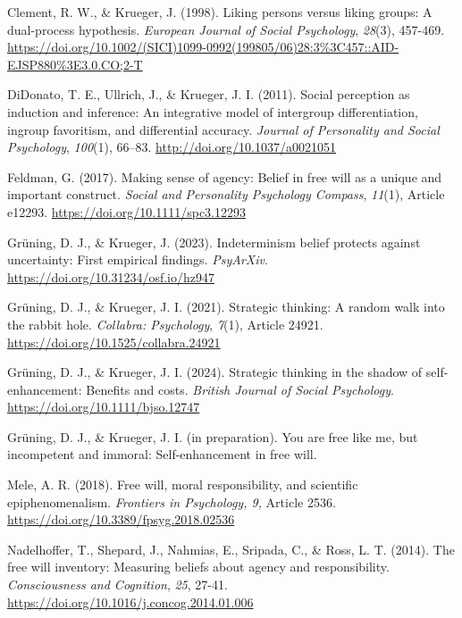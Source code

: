 \documentclass[authordate, anecdote]{jote-new-article}
\begin{document}
	Clement, R. W., \& Krueger, J. (1998). Liking persons versus liking groups: A dual-process hypothesis. \emph{European Journal of Social Psychology},\emph{ 28}(3), 457-469. \url{https://doi.org/10.1002/(SICI)1099-0992(199805/06)28:3\%3C457::AID-EJSP880\%3E3.0.CO;2-T}



	DiDonato, T. E., Ullrich, J., \& Krueger, J. I. (2011). Social perception as induction and inference: An integrative model of intergroup differentiation, ingroup favoritism, and differential accuracy. \emph{Journal of Personality and Social Psychology}, \emph{100}(1), 66--83. \url{http://doi.org/10.1037/a0021051}



	Feldman, G. (2017). Making sense of agency: Belief in free will as a unique and important construct. \emph{Social and Personality Psychology Compass}, \emph{11}(1), Article e12293. \url{https://doi.org/10.1111/spc3.12293}



	Grüning, D. J., \& Krueger, J. (2023). Indeterminism belief protects against uncertainty: First empirical findings. \emph{PsyArXiv}. \url{https://doi.org/10.31234/osf.io/hz947}



	Grüning, D. J., \& Krueger, J. I. (2021). Strategic thinking: A random walk into the rabbit hole. \emph{Collabra: Psychology}, \emph{7}(1), Article 24921. \url{https://doi.org/10.1525/collabra.24921}



	Grüning, D. J., \& Krueger, J. I. (2024). Strategic thinking in the shadow of self-enhancement: Benefits and costs. \emph{British Journal of Social Psychology}. \url{https://doi.org/10.1111/bjso.12747}



	Grüning, D. J., \& Krueger, J. I. (in preparation). You are free like me, but incompetent and immoral: Self-enhancement in free will.



	Mele, A. R. (2018). Free will, moral responsibility, and scientific epiphenomenalism. \emph{Frontiers in Psychology, 9,} Article 2536. \url{https://doi.org/10.3389/fpsyg.2018.02536}



	Nadelhoffer, T., Shepard, J., Nahmias, E., Sripada, C., \& Ross, L. T. (2014). The free will inventory: Measuring beliefs about agency and responsibility. \emph{Consciousness and Cognition}, \emph{25}, 27-41. \url{https://doi.org/10.1016/j.concog.2014.01.006}
\end{document}

